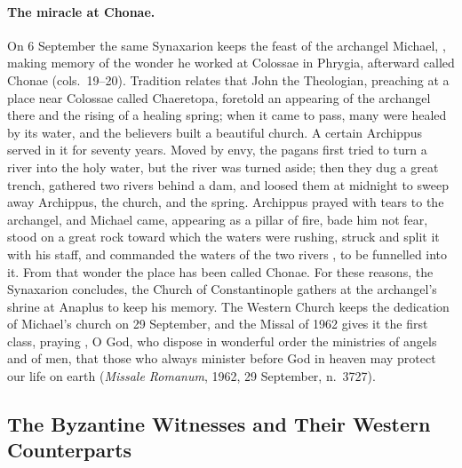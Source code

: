 \paragraph{The miracle at Chonae.} On 6 September the same Synaxarion
keeps the feast of the archangel Michael, , making memory of the wonder he worked at Colossae in Phrygia,
afterward called Chonae (cols.\ 19--20). Tradition relates that John the
Theologian, preaching at a place near Colossae called Chaeretopa, foretold
an appearing of the archangel there and the rising of a healing spring;
when it came to pass, many were healed by its water, and the believers built
a beautiful church. A certain Archippus served in it for seventy years.
Moved by envy, the pagans first tried to turn a river into the holy water,
but the river was turned aside; then they dug a great trench, gathered two
rivers behind a dam, and loosed them at midnight to sweep away Archippus,
the church, and the spring. Archippus prayed with tears to the archangel,
and Michael came, appearing as a pillar of fire, bade him not fear, stood on
a great rock toward which the waters were rushing, struck and split it with
his staff, and commanded the waters of the two rivers ,
to be funnelled into it. From that wonder the place has been called Chonae.
For these reasons, the Synaxarion concludes, the Church of Constantinople
gathers at the archangel's shrine at Anaplus to keep his
memory. The Western Church keeps the dedication of Michael's church on 29
September, and the Missal of 1962 gives it the first class, praying , O God, who
dispose in wonderful order the ministries of angels and of men, that those
who always minister before God in heaven may protect our life on earth
(\emph{Missale Romanum}, 1962, 29 September, n.~3727).

\sectionguard
\subsection{The Byzantine Witnesses and Their Western Counterparts}\label{sec:bz-table}

